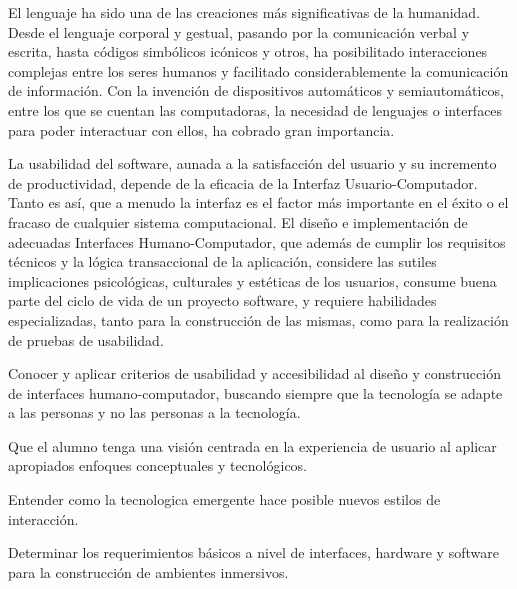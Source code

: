 \begin{syllabus}


\begin{justification}
El lenguaje ha sido una de las creaciones más significativas de la humanidad. Desde el lenguaje corporal y gestual, 
pasando por la comunicación verbal y escrita, hasta códigos simbólicos icónicos y otros, ha posibilitado interacciones complejas 
entre los seres humanos y facilitado considerablemente la comunicación de información. 
Con la invención de dispositivos automáticos y semiautomáticos, entre los que se cuentan las computadoras, 
la necesidad de lenguajes o interfaces para poder interactuar con ellos, ha cobrado gran importancia. 

La usabilidad del software, aunada a la satisfacción del usuario y su incremento de productividad, depende de la eficacia de la Interfaz Usuario-Computador.
Tanto es así­, que a menudo la interfaz es el factor más importante en el éxito o el fracaso de cualquier sistema computacional. 
El diseño e implementación de adecuadas Interfaces Humano-Computador, que además de cumplir los requisitos técnicos y la 
lógica transaccional de la aplicación, considere las sutiles implicaciones psicológicas, culturales y estéticas de los usuarios, 
consume buena parte del ciclo de vida de un proyecto software, y requiere habilidades especializadas, 
tanto para la construcción de las mismas, como para la realización de pruebas de usabilidad.
\end{justification}

\begin{goals}
\item Conocer y aplicar criterios de usabilidad y accesibilidad al diseño y construcción de interfaces humano-computador, buscando siempre que la tecnología se adapte a las personas y no las personas a la tecnología.
\item Que el alumno tenga una visión centrada en la experiencia de usuario al aplicar apropiados enfoques conceptuales y tecnológicos.
\item Entender como la tecnologica emergente hace posible nuevos estilos de interacción. 
\item Determinar los requerimientos básicos a nivel de interfaces, hardware y software para la construcción de ambientes inmersivos.
\end{goals}


\end{syllabus}
